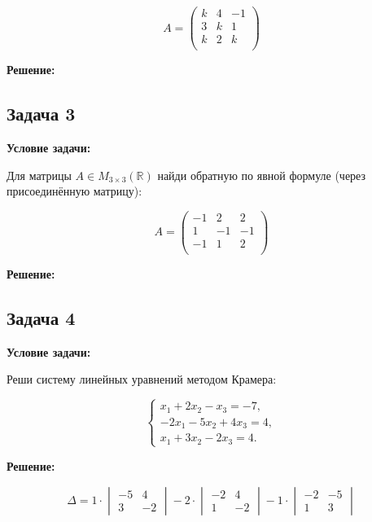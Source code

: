 \documentclass[a4paper,12pt]{article}
\begin{document}
\[
A = \begin{pmatrix}
k & 4 & -1 \\
3 & k & 1 \\
k & 2 & k \\
\end{pmatrix}
\]

\textbf{Решение:}


\vspace{1cm}

\subsection{Задача 3}

\textbf{Условие задачи:}

Для матрицы \( A \in M_{3 \times 3}(\mathbb{R}) \) найди обратную по явной формуле (через присоединённую матрицу):

\[
A = \begin{pmatrix}
-1 & 2 & 2 \\
1 & -1 & -1 \\
-1 & 1 & 2 \\
\end{pmatrix}
\]

\textbf{Решение:}


\vspace{1cm}

\subsection{Задача 4}

\textbf{Условие задачи:}

Реши систему линейных уравнений методом Крамера:

\[
\begin{cases}
x_1 + 2x_2 - x_3 = -7, \\
-2x_1 - 5x_2 + 4x_3 = 4, \\
x_1 + 3x_2 - 2x_3 = 4.
\end{cases}
\]

\textbf{Решение:}

\[
\Delta = 
1 \cdot \begin{vmatrix}
-5 & 4 \\
3 & -2
\end{vmatrix}
- 2 \cdot \begin{vmatrix}
-2 & 4 \\
1 & -2
\end{vmatrix}
-1 \cdot \begin{vmatrix}
-2 & -5 \\
1 & 3
\end{vmatrix}
\]
\end{document}
